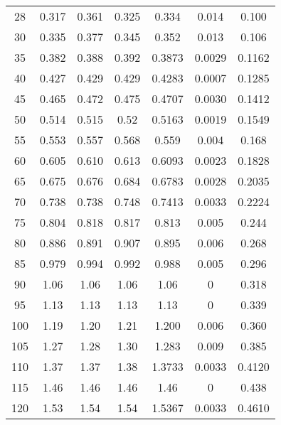 \begin{table}[H]
{\begin{tabular}{
        S[table-format=3.0] 
        S[table-format=1.4] S[table-format=1.4] S[table-format=1.4]
        S[table-format=1.4] S[table-format=1.4] S[table-format=1.3]
        }
        28   & 0.317  & 0.361  & 0.325  & 0.334  & 0.014  & 0.100  \\
        30   & 0.335  & 0.377  & 0.345  & 0.352  & 0.013  & 0.106  \\
        35   & 0.382  & 0.388  & 0.392  & 0.3873 & 0.0029 & 0.1162 \\
        40   & 0.427  & 0.429  & 0.429  & 0.4283 & 0.0007 & 0.1285 \\
        45   & 0.465  & 0.472  & 0.475  & 0.4707 & 0.0030 & 0.1412 \\
        50   & 0.514  & 0.515  & 0.52   & 0.5163 & 0.0019 & 0.1549 \\
        55   & 0.553  & 0.557  & 0.568  & 0.559  & 0.004  & 0.168  \\
        60   & 0.605  & 0.610  & 0.613  & 0.6093 & 0.0023 & 0.1828 \\
        65   & 0.675  & 0.676  & 0.684  & 0.6783 & 0.0028 & 0.2035 \\
        70   & 0.738  & 0.738  & 0.748  & 0.7413 & 0.0033 & 0.2224 \\
        75   & 0.804  & 0.818  & 0.817  & 0.813  & 0.005  & 0.244  \\
        80   & 0.886  & 0.891  & 0.907  & 0.895  & 0.006  & 0.268  \\
        85   & 0.979  & 0.994  & 0.992  & 0.988  & 0.005  & 0.296  \\
        90   & 1.06   & 1.06   & 1.06   & 1.06   & 0      & 0.318  \\
        95   & 1.13   & 1.13   & 1.13   & 1.13   & 0      & 0.339  \\
        100  & 1.19   & 1.20   & 1.21   & 1.200  & 0.006  & 0.360  \\
        105  & 1.27   & 1.28   & 1.30   & 1.283  & 0.009  & 0.385  \\
        110  & 1.37   & 1.37   & 1.38   & 1.3733 & 0.0033 & 0.4120 \\
        115  & 1.46   & 1.46   & 1.46   & 1.46   & 0      & 0.438  \\
        120  & 1.53   & 1.54   & 1.54   & 1.5367 & 0.0033 & 0.4610 \\
        \bottomrule 
      \end{tabular}
      }
\end{table}
%

